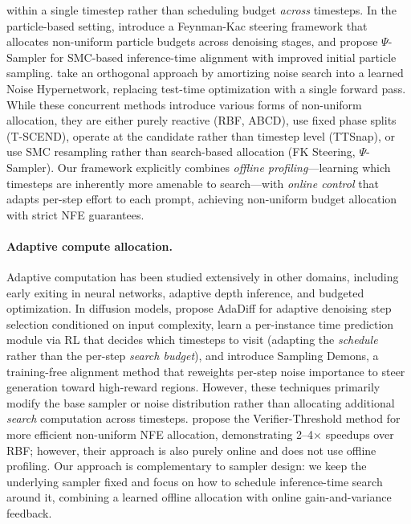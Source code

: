 within a single timestep rather than scheduling budget \emph{across} timesteps.
In the particle-based setting, \citet{singhal2025fk} introduce a Feynman-Kac
steering framework that allocates non-uniform particle budgets across denoising
stages, and \citet{kim2025psi} propose $\Psi$-Sampler for SMC-based
inference-time alignment with improved initial particle sampling.
\citet{eyring2025hypernetworks} take an orthogonal approach by amortizing
noise search into a learned Noise Hypernetwork, replacing test-time
optimization with a single forward pass.
While these concurrent methods introduce various forms of non-uniform
allocation, they are either purely reactive (RBF, ABCD), use fixed phase
splits (T-SCEND), operate at the candidate rather than timestep level (TTSnap),
or use SMC resampling rather than search-based allocation (FK Steering,
$\Psi$-Sampler).
Our framework explicitly combines \emph{offline profiling}---learning which
timesteps are inherently more amenable to search---with \emph{online
control} that adapts per-step effort to each prompt, achieving non-uniform
budget allocation with strict NFE guarantees.

\paragraph{Adaptive compute allocation.}
Adaptive computation has been studied extensively in other domains, including
early exiting in neural networks, adaptive depth inference, and budgeted
optimization.
In diffusion models, \citet{zhang2025adadiff} propose AdaDiff for adaptive
denoising step selection conditioned on input complexity,
\citet{ye2025tpdm} learn a per-instance time prediction module via RL that
decides which timesteps to visit (adapting the \emph{schedule} rather than the
per-step \emph{search budget}), and
\citet{yeh2025demons} introduce Sampling Demons, a training-free alignment
method that reweights per-step noise importance to steer generation toward
high-reward regions.
However, these techniques primarily modify the base sampler or noise
distribution rather than allocating additional \emph{search} computation
across timesteps.
\citet{sundaresha2025vt} propose the Verifier-Threshold method for more
efficient non-uniform NFE allocation, demonstrating 2--4$\times$ speedups
over RBF; however, their approach is also purely online and does not use
offline profiling.
Our approach is complementary to sampler design: we keep the underlying sampler
fixed and focus on how to schedule inference-time search around it, combining
a learned offline allocation with online gain-and-variance feedback.
